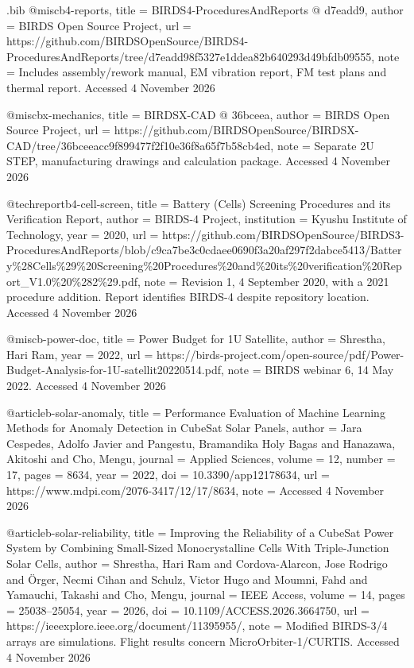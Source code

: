 \begin{filecontents*}[overwrite]{\jobname.bib}
@misc{b4-reports,
  title = {{BIRDS4-\allowbreak{}ProceduresAndReports @ d7eadd9}},
  author = {{BIRDS Open Source Project}},
  url = {https://github.com/BIRDSOpenSource/BIRDS4-ProceduresAndReports/tree/d7eadd98f5327e1ddea82b640293d49bfdb09555},
  note = {Includes assembly/rework manual, EM vibration report, FM test plans and thermal report. Accessed 4 November 2026}
}

@misc{bx-mechanics,
  title = {{BIRDSX-\allowbreak{}CAD @ 36bceea}},
  author = {{BIRDS Open Source Project}},
  url = {https://github.com/BIRDSOpenSource/BIRDSX-CAD/tree/36bceeacc9f899477f2f10e36f8a65f7b58cb4ed},
  note = {Separate 2U STEP, manufacturing drawings and calculation package. Accessed 4 November 2026}
}

@techreport{b4-cell-screen,
  title = {{Battery (Cells) Screening Procedures and its Verification Report}},
  author = {{BIRDS-4 Project}},
  institution = {Kyushu Institute of Technology},
  year = {2020},
  url = {https://github.com/BIRDSOpenSource/BIRDS3-ProceduresAndReports/blob/c9ca7be3c0cdaee0690f3a20af297f2dabce5413/Battery\%28Cells\%29\%20Screening\%20Procedures\%20and\%20its\%20verification\%20Report_V1.0\%20\%282\%29.pdf},
  note = {Revision 1, 4 September 2020, with a 2021 procedure addition. Report identifies BIRDS-4 despite repository location. Accessed 4 November 2026}
}

@misc{b-power-doc,
  title = {{Power Budget for 1U Satellite}},
  author = {Shrestha, Hari Ram},
  year = {2022},
  url = {https://birds-project.com/open-source/pdf/Power-Budget-Analysis-for-1U-satellit20220514.pdf},
  note = {BIRDS webinar 6, 14 May 2022. Accessed 4 November 2026}
}

@article{b-solar-anomaly,
  title = {{Performance Evaluation of Machine Learning Methods for Anomaly Detection in CubeSat Solar Panels}},
  author = {Jara Cespedes, Adolfo Javier and Pangestu, Bramandika Holy Bagas and Hanazawa, Akitoshi and Cho, Mengu},
  journal = {Applied Sciences},
  volume = {12},
  number = {17},
  pages = {8634},
  year = {2022},
  doi = {10.3390/app12178634},
  url = {https://www.mdpi.com/2076-3417/12/17/8634},
  note = {Accessed 4 November 2026}
}

@article{b-solar-reliability,
  title = {{Improving the Reliability of a CubeSat Power System by Combining Small-Sized Monocrystalline Cells With Triple-Junction Solar Cells}},
  author = {Shrestha, Hari Ram and Cordova-Alarcon, Jose Rodrigo and {\"O}rger, Necmi Cihan and Schulz, Victor Hugo and Moumni, Fahd and Yamauchi, Takashi and Cho, Mengu},
  journal = {IEEE Access},
  volume = {14},
  pages = {25038--25054},
  year = {2026},
  doi = {10.1109/ACCESS.2026.3664750},
  url = {https://ieeexplore.ieee.org/document/11395955/},
  note = {Modified BIRDS-3/4 arrays are simulations. Flight results concern MicroOrbiter-1/CURTIS. Accessed 4 November 2026}
}


\end{filecontents*}

